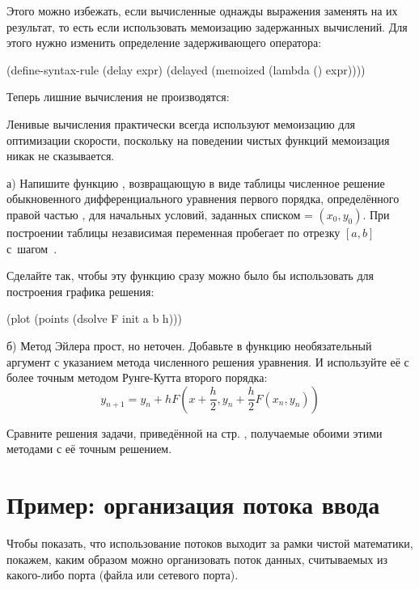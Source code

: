 Этого можно избежать, если вычисленные однажды выражения заменять на их результат, то есть если использовать мемоизацию задержанных вычислений. Для этого нужно изменить определение задерживающего оператора:
\begin{Definition}
(define-syntax-rule (delay expr)
  (delayed (memoized (lambda () expr))))
\end{Definition}
Теперь лишние вычисления не производятся:
\vspace{-\smallskipamount}
\vspace{-\smallskipamount}
\vspace{-\smallskipamount}
\vspace{-\smallskipamount}

Ленивые вычисления практически всегда используют мемоизацию для оптимизации скорости, поскольку на поведении чистых функций мемоизация никак не сказывается.

\newpage
\begin{Assignment}
а) Напишите функцию , возвращающую в виде таблицы численное решение обыкновенного дифференциального уравнения первого порядка, определённого правой частью , для начальных условий, заданных списком  = $(x_0,y_0)$. При построении таблицы независимая переменная пробегает по отрезку $[a,b]$ с~шагом~.

Сделайте так, чтобы эту функцию сразу можно было бы использовать для построения графика решения:
\begin{SchemeCode}[emph={F,init,a,b,h}]
(plot (points (dsolve F init a b h)))
\end{SchemeCode}

б) Метод Эйлера прост, но неточен. Добавьте в функцию  необязательный аргумент с указанием метода численного решения уравнения. И используйте её с более точным методом Рунге-Кутта второго порядка: $$y_{n+1} = y_n + h F\left(x+\frac{h}2,y_n + \frac{h}2F(x_n,y_n)\right)$$

Сравните решения задачи, приведённой на стр. \pageref{ode}, получаемые обоими этими методами с её точным решением.

\end{Assignment}

\section[4]{Пример: организация потока ввода}%
Чтобы показать, что использование потоков выходит за рамки чистой математики, покажем, каким образом можно организовать поток данных, считываемых из какого-либо порта (файла или сетевого порта).


